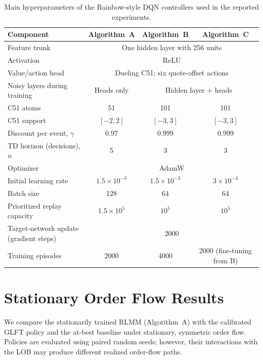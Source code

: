 \documentclass[11pt,a4paper]{article}
\begin{document}
\begin{table}[!htbp]
  \centering
  \caption{Main hyperparameters of the Rainbow-style DQN
controllers used in the reported experiments.}
  \label{tab:dqn_hyperparams}
  \small
  \begin{tabular}{@{}lccc@{}}
    \toprule
    Component & Algorithm~A & Algorithm~B & Algorithm~C \\
    \midrule
    Feature trunk & \multicolumn{3}{c}{One hidden layer with 256 units} \\
    Activation & \multicolumn{3}{c}{ReLU} \\
    Value/action head & \multicolumn{3}{c}{Dueling C51; six quote-offset actions} \\
    Noisy layers during training & Heads only & \multicolumn{2}{c}{Hidden layer + heads} \\
    C51 atoms & 51 & 101 & 101 \\
    C51 support & $[-2,2]$ & $[-3,3]$ & $[-3,3]$ \\
    Discount per event, $\gamma$ & $0.97$ & $0.999$ & $0.999$ \\
    TD horizon (decisions), $n$ & 5 & 3 & 3 \\
    Optimizer & \multicolumn{3}{c}{AdamW} \\
    Initial learning rate & $1.5\times10^{-3}$ & $1.5\times10^{-3}$ & $3\times10^{-4}$ \\
    Batch size & 128 & 64 & 64 \\
    Prioritized replay capacity & $1.5\times10^5$ & $10^5$ & $10^5$ \\
    Target-network update (gradient steps) & \multicolumn{3}{c}{2000} \\
    Training episodes & 2000 & 4000 & 2000 (fine-tuning from B) \\
    \bottomrule
  \end{tabular}
\end{table}
\FloatBarrier

\section{Stationary Order Flow Results}
\label{sec:stationary_results}

We compare the stationarily trained RLMM (Algorithm~A)
with the calibrated GLFT policy and the at-best baseline
under stationary, symmetric order flow.
Policies are evaluated using paired random seeds;
however, their interactions with the LOB may produce
different realized order-flow paths.
\end{document}
